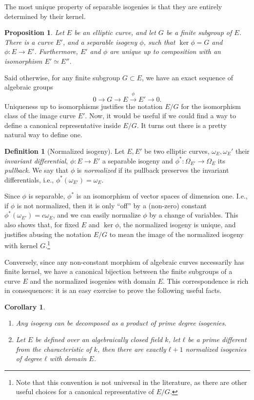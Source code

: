 \documentclass{report}
\theoremstyle{plain}
\newtheorem{corollary}[theorem]{Corollary}
\newtheorem{proposition}[theorem]{Proposition}
\theoremstyle{definition}
\newtheorem{definition}[theorem]{Definition}
\begin{document}
The most unique property of separable isogenies is that they are 
entirely determined by their kernel. %

\begin{proposition}
  Let $E$ be an elliptic curve, and let $G$ be a finite subgroup of
  $E$. %
  There is a curve $E'$, and a separable isogeny $ϕ$, such that
  $\ker ϕ=G$ and $ϕ:E\to E'$. %
  Furthermore, $E'$ and $ϕ$ are unique up to composition with an
  isomorphism $E'≃E''$. %
\end{proposition}

Said otherwise, for any finite subgroup $G⊂E$, we have an exact
sequence of algebraic groups
\begin{equation*}
  0 \to G \to E \overset{ϕ}{\to} E' \to 0.
\end{equation*}
Uniqueness up to isomorphisms justifies the notation $E/G$ for the
isomorphism class of the image curve $E'$. %
Now, it would be useful if we could find a way to define a canonical
representative inside $E/G$. %
It turns out there is a pretty natural way to define one.

\begin{definition}[Normalized isogeny]
  Let $E,E'$ be two elliptic curves, $ω_E,ω_E'$ their \emph{invariant
    differential}, $ϕ:E\to E'$ a separable isogeny and
  $ϕ^*:Ω_{E'}\to Ω_E$ its \emph{pullback}. %
  We say that $ϕ$ is \emph{normalized} if its pullback preserves the
  invariant differentials, i.e., $ϕ^*(ω_{E'})=ω_E$. %
\end{definition}

Since $ϕ$ is separable, $ϕ^*$ is an isomorphism of vector spaces of
dimension one. %
I.e., if $ϕ$ is not normalized, then it is only ``off'' by a
(non-zero) constant $ϕ^*(ω_{E'})=cω_E$, and we can easily normalize
$ϕ$ by a change of variables. %
This also shows that, for fixed $E$ and $\ker ϕ$, the normalized
isogeny is unique, and justifies abusing the notation $E/G$ to mean
the image of the normalized isogeny with kernel $G$.\footnote{Note
  that this convention is not universal in the literature, as there
  are other useful choices for a canonical representative of $E/G$.}

Conversely, since any non-constant morphism of algebraic curves
necessarily has finite kernel, we have a canonical bijection between
the finite subgroups of a curve $E$ and the normalized isogenies with
domain $E$. %
This correspondence is rich in consequences: it is an easy exercise to
prove the following useful facts. %

\begin{corollary}\ 
  \begin{enumerate}
  \item Any isogeny can be decomposed as a product of prime degree
    isogenies.
  \item Let $E$ be defined over an algebraically closed field $k$, let
    $ℓ$ be a prime different from the characteristic of $k$, then
    there are exactly $ℓ+1$ normalized isogenies of degree $ℓ$ with
    domain $E$.
  \end{enumerate}
\end{corollary}
\end{document}
